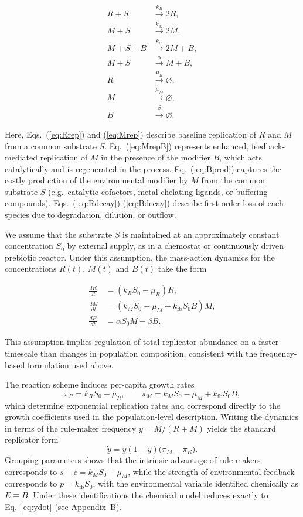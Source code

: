 \documentclass[11pt]{article}
\newcommand{\rev}[1]{#1}
\begin{document}
\begin{align}
R + S &\xrightarrow{k_R} 2R, \label{eq:Rrep} \\
M + S &\xrightarrow{k_M} 2M, \label{eq:Mrep} \\
M + S + B &\xrightarrow{k_{\mathrm{fb}}} 2M + B, \label{eq:MrepB} \\
\rev{M + S} &\xrightarrow{\alpha} \rev{M +} B, \label{eq:Bprod} \\
R &\xrightarrow{\mu_R} \varnothing, \label{eq:Rdecay} \\
M &\xrightarrow{\mu_M} \varnothing, \label{eq:Mdecay} \\
B &\xrightarrow{\beta} \varnothing. \label{eq:Bdecay}
\end{align}

Here, Eqs.~(\ref{eq:Rrep}) and (\ref{eq:Mrep}) describe baseline replication of $R$ and $M$ from a common substrate $S$. Eq.~(\ref{eq:MrepB}) represents enhanced, feedback-mediated replication of $M$ in the presence of the modifier $B$, which acts catalytically and is regenerated in the process. Eq.~(\ref{eq:Bprod}) captures the costly production of the environmental modifier by $M$ \rev{from the common substrate $S$ (e.g.\ catalytic cofactors, metal-chelating ligands, or buffering compounds)}. Eqs.~(\ref{eq:Rdecay})-(\ref{eq:Bdecay}) describe first-order loss of each species due to degradation, dilution, or outflow.

We assume that the substrate $S$ is maintained at an approximately constant concentration $S_0$ by external supply, as in a chemostat or continuously driven prebiotic reactor. Under this assumption, the mass-action dynamics for the concentrations $R(t)$, $M(t)$ and $B(t)$ take the form

\begin{align}
\frac{dR}{dt} &= \left(k_R S_0 - \mu_R\right) R, \label{eq:Rdot} \\
\frac{dM}{dt} &= \left(k_M S_0 - \mu_M + k_{\mathrm{fb}} S_0 B\right) M, \label{eq:Mdot} \\
\frac{dB}{dt} &= \alpha \rev{S_0} M - \beta B. \label{eq:Bdot}
\end{align}

This assumption implies regulation of total replicator abundance on a faster timescale than changes
in population composition, consistent with the frequency-based formulation used above.

The reaction scheme induces per-capita growth rates
\[
\pi_R = k_R S_0 - \mu_R,
\qquad
\pi_M = k_M S_0 - \mu_M + k_{\mathrm{fb}} S_0 B,
\]
which determine exponential replication rates and correspond directly to the growth coefficients
used in the population-level description. Writing the dynamics in terms of the
rule-maker frequency $y = M/(R+M)$ yields the standard replicator form
\[
\dot y = y(1-y)\bigl(\pi_M - \pi_R\bigr).
\]
Grouping parameters shows that the intrinsic advantage of rule-makers corresponds to 
$s-c = k_M S_0 - \mu_M$, while the strength of environmental feedback corresponds to 
$p = k_{\mathrm{fb}} S_0$, with the environmental variable identified chemically as $E \equiv B$.
Under these identifications the chemical model reduces exactly to Eq.~\eqref{eq:ydot} (see Appendix~B).
\end{document}
